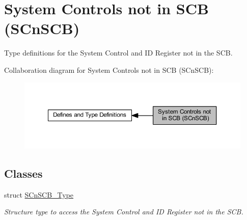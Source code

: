 \hypertarget{group___c_m_s_i_s___s_cn_s_c_b}{}\section{System Controls not in S\+CB (S\+Cn\+S\+CB)}
\label{group___c_m_s_i_s___s_cn_s_c_b}


Type definitions for the System Control and ID Register not in the S\+CB.  


Collaboration diagram for System Controls not in S\+CB (S\+Cn\+S\+CB)\+:
\nopagebreak
\begin{figure}[H]
\begin{center}
\leavevmode
\includegraphics[width=350pt]{group___c_m_s_i_s___s_cn_s_c_b}
\end{center}
\end{figure}
\subsection*{Classes}
\begin{DoxyCompactItemize}
\item 
struct \hyperlink{struct_s_cn_s_c_b___type}{S\+Cn\+S\+C\+B\+\_\+\+Type}
\begin{DoxyCompactList}\small\item\em Structure type to access the System Control and ID Register not in the S\+CB. \end{DoxyCompactList}\end{DoxyCompactItemize}

